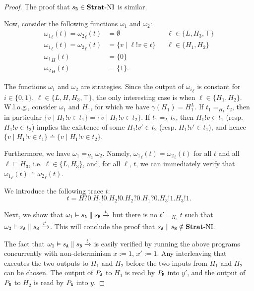 \documentclass[preprint,5p,twocolumn]{elsarticle}
\begin{document}
\begin{proof}
  The proof that $s_{\mathtt{B}} \in \mathbf{Strat}\text{-}\mathrm{NI}$ is similar.

  Now, consider the following functions $\omega_1$ and $\omega_2$:
  \begin{align*}
    {\omega_1}_{\ell}(t) = {\omega_2}_{\ell}(t) &= \emptyset && \ell \in \{L, H_3, \top\}\\
    {\omega_1}_{\ell}(t) = {\omega_2}_{\ell}(t) &= \lbrace v \mid \ell ! v \in t \rbrace && \ell \in \{H_1,H_2\}\\
    {\omega_1}_H(t) &= \{0\} \\
    {\omega_2}_H(t) &= \{1\}.
  \end{align*}

  The functions $\omega_1$ and $\omega_2$ are strategies. Since the output of ${\omega_i}_{\ell}$ is constant
  for $i \in \{0,1\}$, $\ell \in \{L,H,H_3,\top\}$, the only interesting case is when $\ell \in \{H_1,H_2\}$.
  W.l.o.g., consider $\omega_1$ and $H_1$, for which we have $\gamma(H_1) = H_1^L$. If $t_1 =_{H_1} t_2$,
  then in particular $\lbrace v \mid H_1!v  \in t_1\rbrace = \lbrace v \mid H_1! v \in t_2\rbrace$.
  If $t_1 =_L t_2$, then $H_1 ! v \in t_1$ (resp. $H_1 ! v \in t_2$) implies the existence of some $H_1 ! v' \in t_2$
  (resp. $H_1 ! v' \in t_1$), and  hence $\lbrace v \mid H_1!v  \in t_1\rbrace \doteq \lbrace v \mid H_1! v \in t_2\rbrace$.

  Furthermore, we have $\omega_1 =_{H_3} \omega_2$. Namely, ${\omega_1}_{\ell}(t) = {\omega_2}_{\ell}(t)$
  for all $t$ and all $\ell \sqsubseteq H_3$, i.e. $\ell \in \{L, H_3\}$,
  and, for all $\ell$, $t$, we can immediately verify that ${\omega_1}_{\ell}(t)\doteq {\omega_2}_{\ell}(t)$.

  We introduce the following trace $t$:
  $$t = H?0.H_1!0.H_2!0.H_2?0.H_1?0.H_3!1.H_3!1.$$

  Next, we show that $\omega_1 \vDash s_{\mathtt{A}} \parallel s_{\mathtt{B}} \xrightarrow{t}$ but there is no $t' =_{H_3} t$ such that
  $\omega_2 \vDash s_{\mathtt{A}} \parallel s_{\mathtt{B}} \xrightarrow{t'}$. This will conclude the proof that $s_{\mathtt{A}} \parallel s_{\mathtt{B}} \notin \mathbf{Strat}\text{-}\mathrm{NI}$.

  The fact that $\omega_1 \vDash s_{\mathtt{A}} \parallel s_{\mathtt{B}} \xrightarrow{t}$ is easily verified by running the above
  programs concurrently with non-determinism $x := 1$, $x' := 1$. Any interleaving that executes the two outputs to $H_1$ and $H_2$
  before the two inputs from $H_1$ and $H_2$ can be chosen. The output of $P_{\mathtt{A}}$ to $H_1$ is read
  by $P_{\mathtt{B}}$ into $y'$, and the output of $P_{\mathtt{B}}$ to $H_2$ is read by $P_{\mathtt{A}}$  into $y$.


\end{proof}
\end{document}
